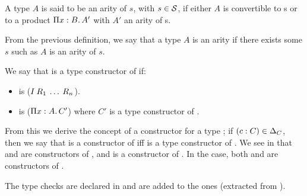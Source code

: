 \begin{Definition}[Arity of $s$] 
A type $A$ is said to be an arity of $s$, with $s\in\mathcal{S}$, if either $A$ is convertible to s or to a product
$\depArrow{x}{B}{A'}$ with $A'$ an arity of s.
\end{Definition}

\noindent From the previous definition, we say that a type $A$ is an arity if there exists some $s$ 
such as $A$ is an arity of $s$.

\begin{Definition} 
We say that \CT{} is a type constructor of \IN{} if:
\begin{itemize}
\item \CT{} is ($\app{I}{R_1}{\dots}{R_n}$).
\item \CT{} is ($\depArrow{x}{A}{C'}$) where $C'$ is a type constructor of \IN{}.
\end{itemize}
\end{Definition}

\noindent From this we derive the concept of a constructor for a type \IN{}; 
if $(c:C)\in\Delta_{C}$, then we say that \CN{} is a constructor of \IN{} iff \CT{} is a
type constructor of \IN{}. We see in 
that  and  are constructors 
of \Indeven{}, and  is a constructor of \Indodd{}. In the \Indnat{} case,
both \ConsO{} and \ConsS{} are constructors of \Indnat{}.

The type checks are declared in  and are added to the \CCw{} ones
(extracted from \cite{timanySozeau:Consistency-pCuIC}). 


